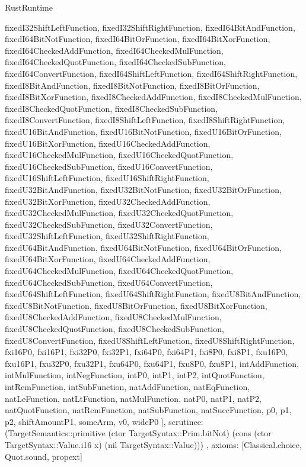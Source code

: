 \begin{lexlean}{RustRuntime}
\begin{semanticmodule}
{{      fixedI32ShiftLeftFunction,
      fixedI32ShiftRightFunction,
      fixedI64BitAndFunction,
      fixedI64BitNotFunction,
      fixedI64BitOrFunction,
      fixedI64BitXorFunction,
      fixedI64CheckedAddFunction,
      fixedI64CheckedMulFunction,
      fixedI64CheckedQuotFunction,
      fixedI64CheckedSubFunction,
      fixedI64ConvertFunction,
      fixedI64ShiftLeftFunction,
      fixedI64ShiftRightFunction,
      fixedI8BitAndFunction,
      fixedI8BitNotFunction,
      fixedI8BitOrFunction,
      fixedI8BitXorFunction,
      fixedI8CheckedAddFunction,
      fixedI8CheckedMulFunction,
      fixedI8CheckedQuotFunction,
      fixedI8CheckedSubFunction,
      fixedI8ConvertFunction,
      fixedI8ShiftLeftFunction,
      fixedI8ShiftRightFunction,
      fixedU16BitAndFunction,
      fixedU16BitNotFunction,
      fixedU16BitOrFunction,
      fixedU16BitXorFunction,
      fixedU16CheckedAddFunction,
      fixedU16CheckedMulFunction,
      fixedU16CheckedQuotFunction,
      fixedU16CheckedSubFunction,
      fixedU16ConvertFunction,
      fixedU16ShiftLeftFunction,
      fixedU16ShiftRightFunction,
      fixedU32BitAndFunction,
      fixedU32BitNotFunction,
      fixedU32BitOrFunction,
      fixedU32BitXorFunction,
      fixedU32CheckedAddFunction,
      fixedU32CheckedMulFunction,
      fixedU32CheckedQuotFunction,
      fixedU32CheckedSubFunction,
      fixedU32ConvertFunction,
      fixedU32ShiftLeftFunction,
      fixedU32ShiftRightFunction,
      fixedU64BitAndFunction,
      fixedU64BitNotFunction,
      fixedU64BitOrFunction,
      fixedU64BitXorFunction,
      fixedU64CheckedAddFunction,
      fixedU64CheckedMulFunction,
      fixedU64CheckedQuotFunction,
      fixedU64CheckedSubFunction,
      fixedU64ConvertFunction,
      fixedU64ShiftLeftFunction,
      fixedU64ShiftRightFunction,
      fixedU8BitAndFunction,
      fixedU8BitNotFunction,
      fixedU8BitOrFunction,
      fixedU8BitXorFunction,
      fixedU8CheckedAddFunction,
      fixedU8CheckedMulFunction,
      fixedU8CheckedQuotFunction,
      fixedU8CheckedSubFunction,
      fixedU8ConvertFunction,
      fixedU8ShiftLeftFunction,
      fixedU8ShiftRightFunction,
      fxi16P0,
      fxi16P1,
      fxi32P0,
      fxi32P1,
      fxi64P0,
      fxi64P1,
      fxi8P0,
      fxi8P1,
      fxu16P0,
      fxu16P1,
      fxu32P0,
      fxu32P1,
      fxu64P0,
      fxu64P1,
      fxu8P0,
      fxu8P1,
      intAddFunction,
      intMulFunction,
      intNegFunction,
      intP0,
      intP1,
      intP2,
      intQuotFunction,
      intRemFunction,
      intSubFunction,
      natAddFunction,
      natEqFunction,
      natLeFunction,
      natLtFunction,
      natMulFunction,
      natP0,
      natP1,
      natP2,
      natQuotFunction,
      natRemFunction,
      natSubFunction,
      natSuccFunction,
      p0,
      p1,
      p2,
      shiftAmountP1,
      someArm,
      v0,
      wideP0
    ],
    scrutinee: (TargetSemantics::primitive (ctor TargetSyntax::Prim.bitNot) (cons (ctor TargetSyntax::Value.i16 x) (nil TargetSyntax::Value)))
  },
  axioms: [Classical.choice, Quot.sound, propext]
}


\end{semanticmodule}
\end{lexlean}

